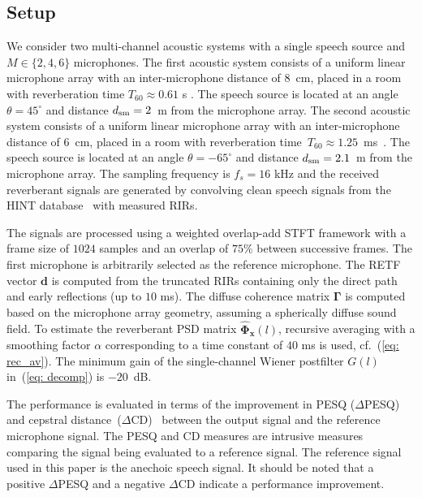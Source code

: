 \documentclass{article}
\begin{document}
\subsection{Setup}
We consider two multi-channel acoustic systems with a single speech source and $M \in \{2, 4, 6 \}$ microphones.
The first acoustic system consists of a uniform linear microphone array with an inter-microphone distance of $8$~cm, placed in a room with reverberation time $T_{60} \approx 0.61$ s \cite{hadad_IWAENC_2014}.
The speech source is located at an angle $\theta = 45^{\circ}$ and distance $d_{\rm sm} = 2$~m from the microphone array.
The second acoustic system consists of a uniform linear microphone array with an inter-microphone distance of $6$~cm, placed in a room with reverberation time~$T_{60} \approx 1.25$~ms~\cite{Eaton_WASPAA_2015}.
The speech source is located at an angle $\theta = -65^{\circ}$ and distance $d_{\rm sm} = 2.1$~m from the microphone array.
The sampling frequency is $f_s = 16$ kHz and the received reverberant signals are generated by convolving clean speech signals from the HINT database~\cite{Nilsson_JASA_1994} with measured RIRs. 

The signals are processed using a weighted overlap-add STFT framework with a frame size of $1024$ samples and an overlap of $75 \%$ between successive frames. 
The first microphone is arbitrarily selected as the reference microphone.
The RETF vector $\mathbf{d}$ is computed from the truncated RIRs containing only the direct path and early reflections (up to $10$ ms).
The diffuse coherence matrix $\boldsymbol{\Gamma}$ is computed based on the microphone array geometry, assuming a spherically diffuse sound field. 
To estimate the reverberant PSD matrix $\hat{\boldsymbol{\Phi}}_{\mathbf{x}}(l)$, recursive averaging with a smoothing factor $\alpha$ corresponding to a time constant of $40$ ms is used, cf.~(\ref{eq: rec_av}).
The minimum gain of the single-channel Wiener postfilter $G(l)$ in~(\ref{eq: decomp}) is $-20$~dB.

The performance is evaluated in terms of the improvement in PESQ ($\Delta$PESQ) \cite{PESQ} and cepstral distance~($\Delta$CD)~\cite{Quackenbush_book} between the output signal and the reference microphone signal.
The PESQ and CD measures are intrusive measures comparing the signal being evaluated to a reference signal. 
The reference signal used in this paper is the anechoic speech signal.
It should be noted that a positive $\Delta$PESQ and a negative $\Delta$CD indicate a performance improvement.
\end{document}
